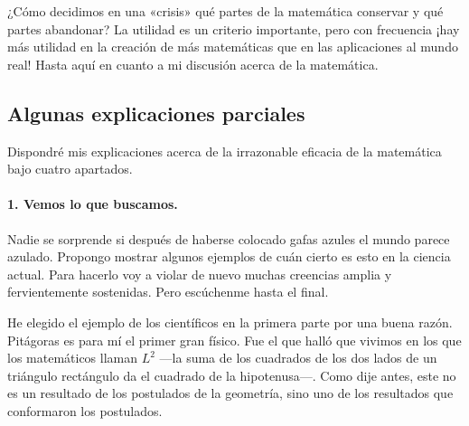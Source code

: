 \documentclass[a4paper, 12pt]{article}
\begin{document}
 

¿Cómo decidimos en una «crisis» qué partes de la matemática conservar y qué partes abandonar? La utilidad es un criterio importante, pero con frecuencia ¡hay más utilidad en la creación de más matemáticas que en las aplicaciones al mundo real! Hasta aquí en cuanto a mi  discusión acerca de la matemática.

 

\subsection*{Algunas explicaciones parciales}

 Dispondré mis explicaciones acerca de la irrazonable eficacia de la matemática bajo cuatro apartados.

 

\paragraph*{1. Vemos lo que buscamos.}


 Nadie se sorprende si después de haberse colocado gafas azules el mundo parece azulado. Propongo mostrar algunos ejemplos de cuán cierto es esto en la ciencia actual. Para hacerlo voy a violar de nuevo muchas creencias amplia y fervientemente sostenidas. Pero escúchenme hasta el final.

 

He elegido el ejemplo de los científicos en la primera parte por una buena razón. Pitágoras es para mí el primer gran físico. Fue el que halló que vivimos en los que los matemáticos llaman $L^2$ ---la suma de los cuadrados de los dos lados de un triángulo rectángulo da el cuadrado de la hipote\-nusa\mbox{---.} Como dije antes, este no es un resultado de los postulados de la geometría, sino uno de los resultados que conformaron los postulados.

 
\end{document}
